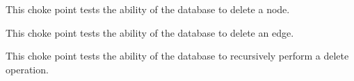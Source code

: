 
This choke point tests the ability of the database to delete a node.





This choke point tests the ability of the database to delete an edge.





This choke point tests the ability of the database to recursively perform a delete operation.


